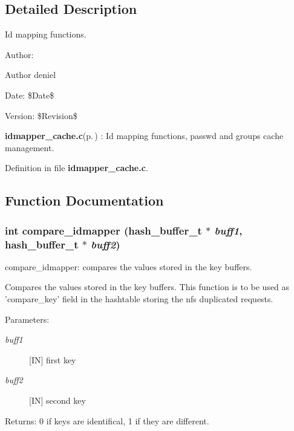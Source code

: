 \subsection{Detailed Description}
Id mapping functions. 

\begin{Desc}
\item[Author:]\begin{Desc}
\item[Author]deniel \end{Desc}
\end{Desc}
\begin{Desc}
\item[Date:]\$Date\$ \end{Desc}
\begin{Desc}
\item[Version:]\$Revision\$ \end{Desc}
{\bf idmapper\_\-cache.c}{\rm (p.\,\pageref{idmapper__cache_8c})} : Id mapping functions, passwd and groups cache management.

Definition in file {\bf idmapper\_\-cache.c}.

\subsection{Function Documentation}
\subsubsection{\setlength{\rightskip}{0pt plus 5cm}int compare\_\-idmapper (hash\_\-buffer\_\-t $\ast$ {\em buff1}, hash\_\-buffer\_\-t $\ast$ {\em buff2})}\label{idmapper__cache_8c_a10}


compare\_\-idmapper: compares the values stored in the key buffers.

Compares the values stored in the key buffers. This function is to be used as 'compare\_\-key' field in the hashtable storing the nfs duplicated requests.

\begin{Desc}
\item[Parameters:]
\begin{description}
\item[{\em buff1}][IN] first key \item[{\em buff2}][IN] second key\end{description}
\end{Desc}
\begin{Desc}
\item[Returns:]0 if keys are identifical, 1 if they are different. \end{Desc}


